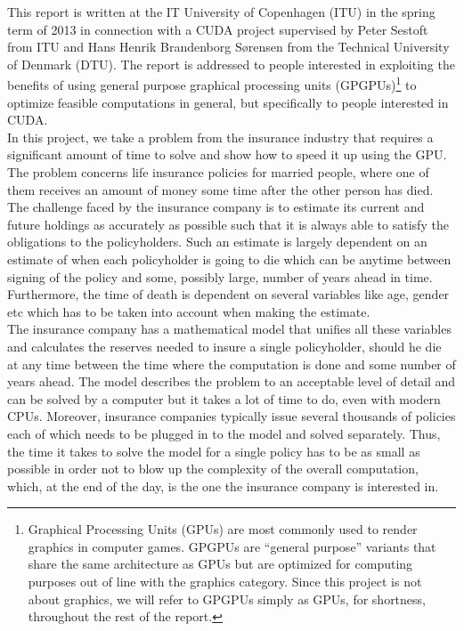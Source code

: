 This report is written at the IT University of Copenhagen (ITU) in the spring term of 2013 in connection with a CUDA project supervised by Peter Sestoft from ITU and Hans Henrik Brandenborg Sørensen from the Technical University of Denmark (DTU). The report is addressed to people interested in exploiting the benefits of using general purpose graphical processing units (GPGPUs)\footnote{Graphical Processing Units (GPUs) are most commonly used to render graphics in computer games. GPGPUs are ``general purpose'' variants that share the same architecture as GPUs but are optimized for computing purposes out of line with the graphics category. Since this project is not about graphics, we will refer to GPGPUs simply as GPUs, for shortness, throughout the rest of the report.} to optimize feasible computations in general, but specifically to people interested in CUDA.\\

In this project, we take a problem from the insurance industry that requires a significant amount of time to solve and show how to speed it up using the GPU. The problem concerns life insurance policies for married people, where one of them receives an amount of money some time after the other person has died. The challenge faced by the insurance company is to estimate its current and future holdings as accurately as possible such that it is always able to satisfy the obligations to the policyholders. Such an estimate is largely dependent on an estimate of when each policyholder is going to die which can be anytime between signing of the policy and some, possibly large, number of years ahead in time. Furthermore, the time of death is dependent on several variables like age, gender etc which has to be taken into account when making the estimate. \\

The insurance company has a mathematical model that unifies all these variables and calculates the reserves needed to insure a single policyholder, should he die at any time between the time where the computation is done and some number of years ahead. The model describes the problem to an acceptable level of detail and can be solved by a computer but it takes a lot of time to do, even with modern CPUs. Moreover, insurance companies typically issue several thousands of policies each of which needs to be plugged in to the model and solved separately. Thus, the time it takes to solve the model for a single policy has to be as small as possible in order not to blow up the complexity of the overall computation, which, at the end of the day, is the one the insurance company is interested in. 

